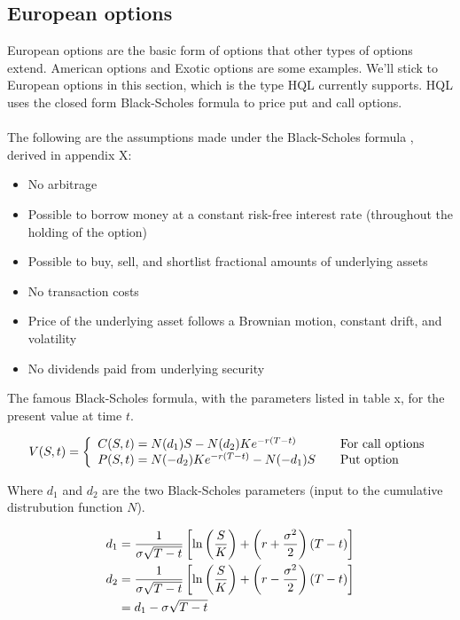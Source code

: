 \documentclass[11pt,a4paper]{article}
\numberwithin{equation}{section}
\begin{document}
\subsection{European options}
European options are the basic form of options that other types of options extend.
American options and Exotic options are some examples. We'll stick to European
options in this section, which is the type HQL currently supports. HQL uses the closed
form Black-Scholes formula to price put and call options.
\\\\
The following are the assumptions made under the Black-Scholes formula \cite{astborg:fsharp}, derived in appendix X:
\begin{itemize}
\item No arbitrage
\item Possible to borrow money at a constant risk-free interest rate (throughout the
holding of the option)
\item Possible to buy, sell, and shortlist fractional amounts of underlying assets
\item No transaction costs
\item Price of the underlying asset follows a Brownian motion, constant drift,
and volatility
\item No dividends paid from underlying security
\end{itemize}

The famous Black-Scholes formula, with the parameters listed in table x, for the present value at time $t$.

\[ V(S,t) = \left\{
  \begin{array}{l l}
    C(S,t) = N(d_1)S-N(d_2)Ke^{-r(T-t)} & \quad \text{For call options} \\
    P(S,t) = N(-d_2)Ke^{-r(T-t)}-N(-d_1)S & \quad \text{Put option}
  \end{array} \right.\]

Where $d_1$ and $d_2$ are the two Black-Scholes parameters (input to the cumulative distrubution function $N$).

\begin{align} 
     d_1 &= \frac{1}{\sigma\sqrt{T - t}}\left[\ln\left(\frac{S}{K}\right) + \left(r + \frac{\sigma^2}{2}\right)(T - t)\right] \notag\\
     d_2 &= \frac{1}{\sigma\sqrt{T - t}}\left[\ln\left(\frac{S}{K}\right) + \left(r - \frac{\sigma^2}{2}\right)(T - t)\right] \notag\\
         &= d_1 - \sigma\sqrt{T - t} \notag
\end{align}
\end{document}
